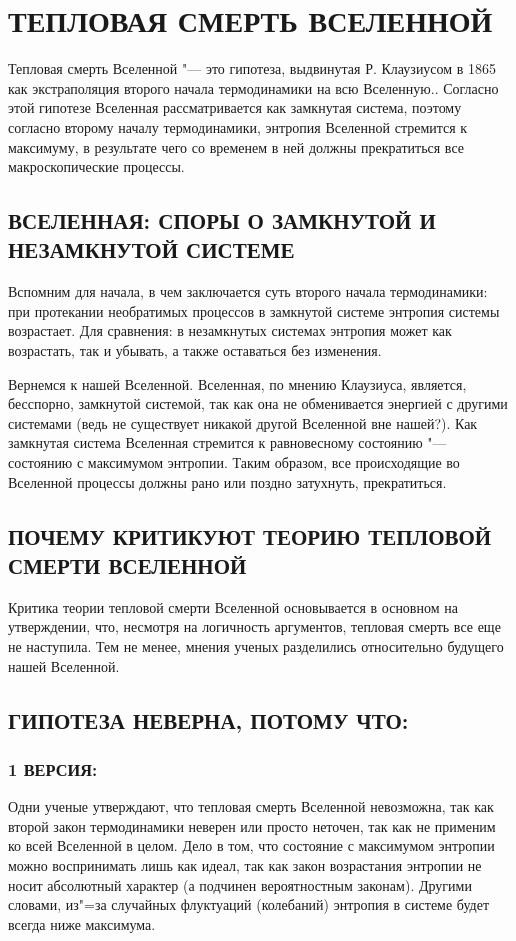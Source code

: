 \documentclass[referat, times]{SCWorks}
\begin{document}
\section{ТЕПЛОВАЯ СМЕРТЬ ВСЕЛЕННОЙ}
Тепловая смерть Вселенной "--- это гипотеза, выдвинутая Р. Клаузиусом в 1865 как экстраполяция второго начала термодинамики на всю Вселенную.\cite{smopr}. Согласно этой гипотезе Вселенная рассматривается как замкнутая система, поэтому согласно второму началу термодинамики, энтропия Вселенной стремится к максимуму, в результате чего со временем в ней должны прекратиться все макроскопические процессы.
\subsection{ВСЕЛЕННАЯ: СПОРЫ О ЗАМКНУТОЙ И НЕЗАМКНУТОЙ СИСТЕМЕ}
Вспомним для начала, в чем заключается суть второго начала термодинамики: при протекании необратимых процессов в замкнутой системе энтропия системы возрастает. Для сравнения: в незамкнутых системах энтропия может как возрастать, так и убывать, а также оставаться без изменения.

Вернемся к нашей Вселенной. Вселенная, по мнению Клаузиуса, является, бесспорно, замкнутой системой, так как она не обменивается энергией с другими системами (ведь не существует никакой другой Вселенной вне нашей?). Как замкнутая система Вселенная стремится к равновесному состоянию "--- состоянию с максимумом энтропии. Таким образом, все происходящие во Вселенной процессы должны рано или поздно затухнуть, прекратиться.
\subsection{ПОЧЕМУ КРИТИКУЮТ ТЕОРИЮ ТЕПЛОВОЙ СМЕРТИ ВСЕЛЕННОЙ}
Критика теории тепловой смерти Вселенной основывается в основном на утверждении, что, несмотря на логичность аргументов, тепловая смерть все еще не наступила. Тем не менее, мнения ученых разделились относительно будущего нашей Вселенной.
\subsection{ГИПОТЕЗА НЕВЕРНА, ПОТОМУ ЧТО:}
\subsubsection{1 ВЕРСИЯ:}
Одни ученые утверждают, что тепловая смерть Вселенной невозможна, так как второй закон термодинамики неверен или просто неточен, так как не применим ко всей Вселенной в целом. Дело в том, что состояние с максимумом энтропии можно воспринимать лишь как идеал, так как закон возрастания энтропии не носит абсолютный характер (а подчинен вероятностным законам). Другими словами, из"=за случайных флуктуаций (колебаний) энтропия в системе будет всегда ниже максимума.
\end{document}
